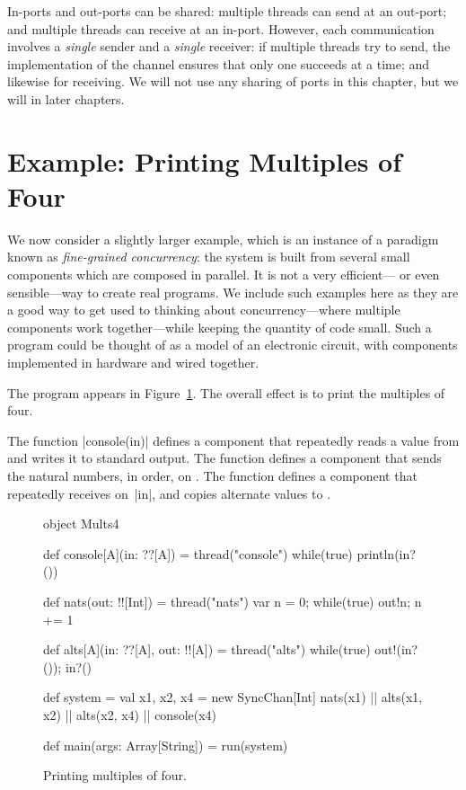 In-ports and out-ports can be shared: multiple threads can send at an
out-port; and multiple threads can receive at an in-port.  However,
each communication involves a \emph{single} sender and a \emph{single}
receiver: if multiple  threads try to send, the implementation of the channel
ensures that only one succeeds at a time; and likewise for receiving.  We will
not use any sharing of ports in this chapter, but we will in later chapters.


\section{Example: Printing Multiples of Four}

We now consider a slightly larger example, which is an instance of a paradigm
known as \emph{fine-grained concurrency}: the
system is built from several small components which are composed in parallel.
It is not a very efficient--- or even sensible---way to create real programs.
We include such examples here as they are a good way to get used to thinking
about concurrency---where multiple components work together---while keeping
the quantity of code small.  Such a program could be thought of as a model of
an electronic circuit, with components implemented in hardware and wired
together.

The program appears in Figure~\ref{fig:Mults4}. The overall effect is to print
the multiples of four.

The function |console(in)| defines a component that repeatedly reads a value
from  and writes it to standard output.  The function
 defines a component that sends the natural numbers, in
order, on .  The function  defines a component
that repeatedly receives on~|in|, and copies alternate values to .


\begin{figure}
\begin{scala}
object Mults4{
  def console[A](in: ??[A]) = thread("console"){ while(true) println(in?()) }

  def nats(out: !![Int]) = thread("nats"){ 
    var n = 0; while(true){ out!n; n += 1 }
  }

  def alts[A](in: ??[A], out: !![A]) = thread("alts"){ 
    while(true){ out!(in?()); in?() } 
  }

  def system = {
    val x1, x2, x4 = new SyncChan[Int]
    nats(x1) || alts(x1, x2) || alts(x2, x4) || console(x4)
  }

  def main(args: Array[String]) = run(system)
}
\end{scala}
\caption{Printing multiples of four.}
\label{fig:Mults4}
\end{figure}

